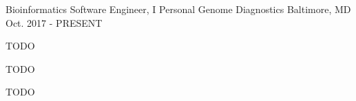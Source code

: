 

\begin{cventries}

  \cventry
    {Bioinformatics Software Engineer, I} %
    {Personal Genome Diagnostics} %
    {Baltimore, MD} %
    {Oct. 2017 - PRESENT} %
    {
      \begin{cvitems} %
        \item{TODO}
        \item{TODO}
        \item{TODO}
      \end{cvitems}
    }


\end{cventries}
